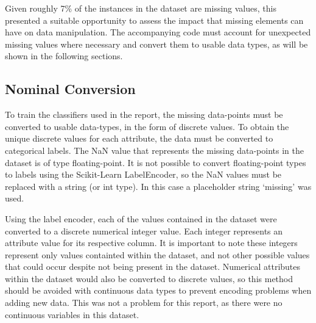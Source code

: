\documentclass{article}
\begin{document}

Given roughly 7\% of the instances in the dataset are missing values, this presented a suitable opportunity to assess the impact 
that missing elements can have on data manipulation. The accompanying code must account for unexpected missing values
where necessary and convert them to usable data types, as will be shown in the following sections.


\subsection{Nominal Conversion}

To train the classifiers used in the report, the missing data-points must be converted to usable data-types, in the form of discrete values. 
To obtain the unique discrete values for each attribute, the data must be converted to categorical labels. The NaN value that represents the missing 
data-points in the dataset is of type floating-point. 
It is not possible to convert floating-point types to labels using the Scikit-Learn LabelEncoder, so the NaN values must be replaced with a string (or int type).
 In this case a placeholder string `missing' was used.
\vspace{2mm}

Using the label encoder, each of the values contained in the dataset were converted to a discrete numerical integer value. Each integer 
represents an attribute value for its respective column. It is important to note these integers represent only values containted within the 
dataset, and not other possible values that could occur despite not being present in the dataset. Numerical attributes
within the dataset would also be converted to discrete values, so this method should be avoided with continuous data types to prevent 
encoding problems when adding new data. This was not a problem for this report, as there were no continuous variables in this dataset.

\vspace{2mm}
\end{document}
